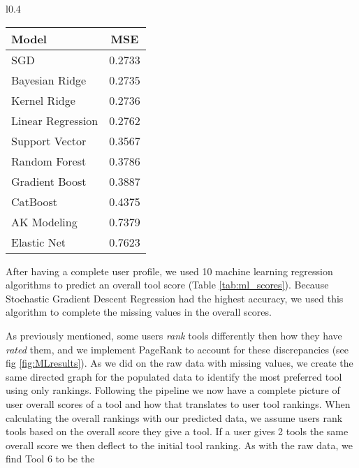 \vspace{-2mm}
\begin{wraptable}[20]{l}{0.4\textwidth}
\centering
\setlength \extrarowheight{4pt}
\begin{tabular}{l c}
\toprule
{\color[HTML]{000000} \textbf{Model}}  & {\color[HTML]{000000} \textbf{MSE}} \\ \hline
SGD & 0.2733 \\ 
Bayesian Ridge    & 0.2735\\ 
Kernel Ridge      & 0.2736 \\ 
Linear Regression            & 0.2762 \\ 
Support Vector    & 0.3567 \\ 
Random Forest     & 0.3786  \\ 
Gradient Boost    & 0.3887 \\ 
CatBoost          & 0.4375  \\ 
AK Modeling & 0.7379  \\ 
Elastic Net       & 0.7623 \\ 
\bottomrule
\end{tabular}
\captionsetup{font = scriptsize}
\caption{Ten machine learning algorithms compared based on Cross Validation Mean Squared Error.}
\label{tab:ml_scores}
\end{wraptable}
After having a complete user profile, we used 10 machine learning regression algorithms to predict an overall tool score (Table \ref{tab:ml_scores}). Because Stochastic Gradient Descent Regression had the highest accuracy, we used this algorithm to complete the missing values in the overall scores.


As previously mentioned, some users \textit{rank} tools differently then how they have \textit{rated} them, and we implement PageRank to account for these discrepancies (see fig \ref{fig:MLresults}). As we did on the raw data with missing values, we create the same directed graph for the populated data to identify the most preferred tool using only rankings. Following the pipeline we now have a complete picture of user overall scores of a tool and how that translates to user tool rankings. When calculating the overall rankings with our predicted data, we assume users rank tools based on the overall score they give a tool. If a user gives 2 tools the same overall score we then deflect to the initial tool ranking. As with the raw data, we find Tool 6 to be the 

